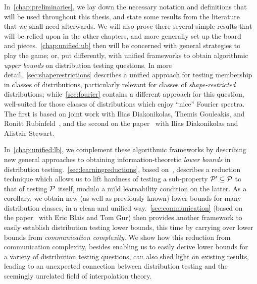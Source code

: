 In~\cref{chap:preliminaries}, we lay down the necessary notation and definitions that will be used throughout this thesis, and state some results from the literature that we shall need afterwards. We will also prove there several simple results that will be relied upon in the other chapters, and more generally set up the board and pieces.~\cref{chap:unified:ub} then will be concerned with general strategies to play the game; or, put differently, with unified frameworks to obtain algorithmic \emph{upper bounds} on distribution testing questions. In more detail,~\cref{sec:shaperestrictions} describes a unified approach for testing membership in classes of distributions, particularly relevant for classes of \emph{shape-restricted} distributions; while~\cref{sec:fourier} contains a different approach for this question, well-suited for those classes of distributions which enjoy ``nice'' Fourier spectra. The first is based on joint work with Ilias Diakonikolas, Themis Gouleakis, and Ronitt Rubinfeld~\cite{CDGR:16}, and the second on the paper~\cite{CanonneDS:17} with Ilias Diakonikolas and Alistair Stewart.

In~\cref{chap:unified:lb}, we complement these algorithmic frameworks by describing new general approaches to obtaining information-theoretic \emph{lower bounds} in distribution testing.~\cref{sec:learningreductions}, based on~\cite{CDGR:16}, describes a reduction technique which allows us to lift hardness of testing a sub-property $\mathcal{P}'\subseteq\mathcal{P}$ to that of testing $\mathcal{P}$ itself, modulo a mild learnability condition on the latter. As a corollary, we obtain new (as well as previously known) lower bounds for many distribution classes, in a clean and unified way.~\cref{sec:communication} (based on the paper~\cite{BCG:17} with Eric Blais and Tom Gur) then provides another framework  to easily establish distribution testing lower bounds, this time by carrying over lower bounds from \emph{communication complexity}. We show how this reduction from communication complexity, besides enabling us to easily derive lower bounds for a variety of distribution testing questions, can also shed light on existing results, leading to an unexpected connection between distribution testing and the seemingly unrelated field of interpolation theory.

